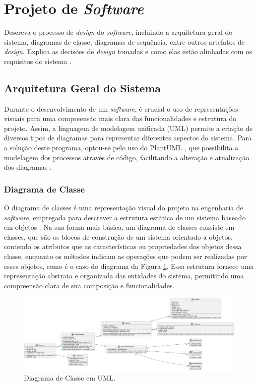 \section{Projeto de \textit{Software}}

Descreva o processo de \textit{design} do \textit{software}, incluindo a arquitetura geral do sistema, diagramas de classe, diagramas de sequência, entre outros artefatos de \textit{design}. Explica as decisões de \textit{design} tomadas e como elas estão alinhadas com os requisitos do sistema \cite{softwareeng}.

\subsection{Arquitetura Geral do Sistema}

Durante o desenvolvimento de um \textit{software}, é crucial o uso de representações visuais para uma compreensão mais clara das funcionalidades e estrutura do projeto. Assim, a linguagem de modelagem unificada (UML) permite a criação de diversos tipos de diagramas para representar diferentes aspectos do sistema. Para a solução deste programa, optou-se pelo uso do PlantUML \cite{plantumldoc}, que possibilita a modelagem dos processos através de código, facilitando a alteração e atualização dos diagramas \cite{softwareengreq}.

\subsubsection{Diagrama de Classe}

O diagrama de classes é uma representação visual do projeto na engenharia de \textit{software}, empregada para descrever a estrutura estática de um sistema baseado em objetos \cite{softwareenguml}. Na sua forma mais básica, um diagrama de classes consiste em classes, que são os blocos de construção de um sistema orientado a objetos, contendo os atributos que as características ou propriedades dos objetos dessa classe, enquanto os métodos indicam as operações que podem ser realizadas por esses objetos, como é o caso do diagrama da Figura \ref{fig:ClassDiagram}. Essa estrutura fornece uma representação abstrata e organizada das entidades do sistema, permitindo uma compreensão clara de sua composição e funcionalidades.
            
\begin{figure}[htb]
    \caption{\label{fig:ClassDiagram}Diagrama de Classe em UML.}
    \begin{center}
        \includegraphics[width=\textwidth]{figuras/ClassDiagram.png}
    \end{center}
\end{figure}
            
